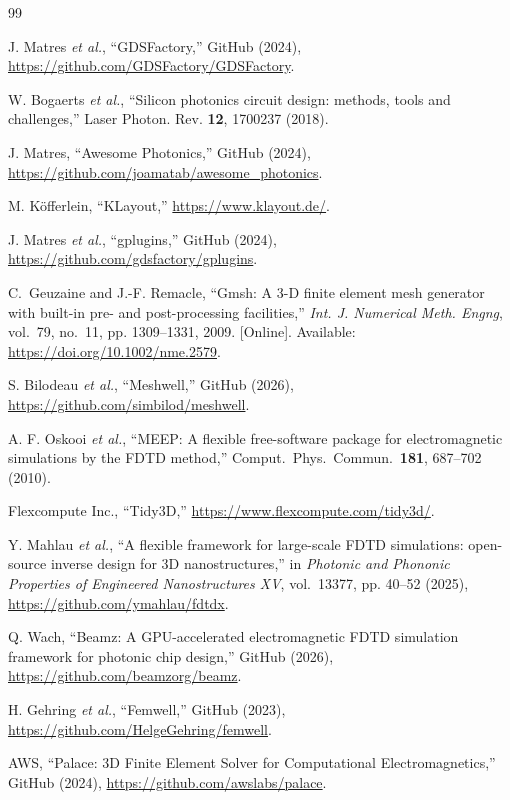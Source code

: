 \documentclass[]{spie}  %
\begin{document}
\begin{thebibliography}{99}

 J. Matres \textit{et al.}, ``GDSFactory,'' GitHub (2024), \url{https://github.com/GDSFactory/GDSFactory}.

 W. Bogaerts \textit{et al.}, ``Silicon photonics circuit design: methods, tools and challenges,'' Laser Photon. Rev. \textbf{12}, 1700237 (2018).

 J. Matres, ``Awesome Photonics,'' GitHub (2024), \url{https://github.com/joamatab/awesome_photonics}.

 M. K\"offerlein, ``KLayout,'' \url{https://www.klayout.de/}.

 J. Matres \textit{et al.}, ``gplugins,'' GitHub (2024), \url{https://github.com/gdsfactory/gplugins}.

 C.~Geuzaine and J.-F. Remacle, ``Gmsh: {A} 3-{D} finite element mesh generator with built-in pre- and post-processing facilities,'' \emph{Int. J. Numerical Meth. Engng}, vol.~79, no.~11, pp. 1309--1331, 2009. [Online]. Available: \url{https://doi.org/10.1002/nme.2579}.

 S. Bilodeau \textit{et al.}, ``Meshwell,'' GitHub (2026), \url{https://github.com/simbilod/meshwell}.

 A. F. Oskooi \textit{et al.}, ``MEEP: A flexible free-software package for electromagnetic simulations by the FDTD method,'' Comput.\ Phys.\ Commun.\ \textbf{181}, 687--702 (2010). %

 Flexcompute Inc., ``Tidy3D,'' \url{https://www.flexcompute.com/tidy3d/}.

 Y. Mahlau \textit{et al.}, ``A flexible framework for large-scale FDTD simulations: open-source inverse design for 3D nanostructures,'' in \textit{Photonic and Phononic Properties of Engineered Nanostructures XV}, vol.~13377, pp. 40--52 (2025), \url{https://github.com/ymahlau/fdtdx}.

 Q. Wach, ``Beamz: A GPU-accelerated electromagnetic FDTD simulation framework for photonic chip design,'' GitHub (2026), \url{https://github.com/beamzorg/beamz}.

 H. Gehring \textit{et al.}, ``Femwell,'' GitHub (2023), \url{https://github.com/HelgeGehring/femwell}.

 AWS, ``Palace: 3D Finite Element Solver for Computational Electromagnetics,'' GitHub (2024), \url{https://github.com/awslabs/palace}.


\end{thebibliography}
\end{document}
